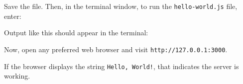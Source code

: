 Save the file. Then, in the terminal window, to run the
\texttt{hello-world.js} file, enter:

\begin{Shaded}
\begin{Highlighting}[]
\end{Highlighting}
\end{Shaded}

Output like this should appear in the terminal:

\begin{Shaded}
\begin{Highlighting}[]
\end{Highlighting}
\end{Shaded}

Now, open any preferred web browser and visit
\texttt{http://127.0.0.1:3000}.

If the browser displays the string \texttt{Hello,\ World!}, that
indicates the server is working.
